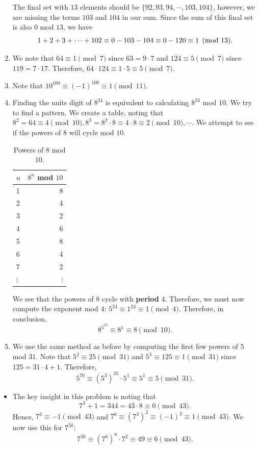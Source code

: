 \begin{enumerate}
	The final set with $13$ elements should be $\{92, 93, 94, \cdots, 103, 104\}$, however, we are \color{blue} missing the terms $103$ and $104$ in our sum\color{black}. Since the sum of this final set is also $0$ mod $13$, we have $$1+2+3+\cdots+102\equiv 0-103-104\equiv 0-12\-0\equiv 1\pmod{13}.$$ 
\clearpage
	\item We note that $64\equiv 1\pmod{7}$ since $63=9\cdot 7$ and $124\equiv 5\pmod{7}$ since $119=7\cdot 17$. Therefore, $64\cdot 124\equiv 1\cdot 5\equiv \boxed{5}\pmod{7}.$
	\item Note that $10^{100}\equiv \left(-1\right)^{100}\equiv 1\pmod{11}.$
	\item Finding the units digit of $8^{24}$ is equivalent to calculating $8^{24}$ mod $10$. We try to find a pattern. We create a table, noting that $8^2=64\equiv 4\pmod{10}, 8^3=8^2\cdot 8\equiv 4\cdot 8\equiv 2\pmod{10}, \cdots$. We attempt to see if the powers of $8$ will cycle mod $10$.
	\clearpage 
	\begin{table}[H]
		\centering
		\begin{tabular}{l r}
			\toprule
			$n$ & $8^n$ mod $10$ \\
			\midrule
			1 & 8\\
			2 & 4 \\ 
			3 & 2 \\
			4 & 6 \\
			5 & 8 \\
			6 & 4 \\
			7 & 2 \\
			$\vdots$ & $\vdots$  \\
			\bottomrule
		\end{tabular}
		\caption{Powers of $8$ mod $10$.}
	\end{table}
	\clearpage
	We see that the powers of $8$ cycle with \textbf{period} 4. Therefore, we must now compute the exponent mod $4$: $5^{24}\equiv 1^{24}\equiv 1\pmod{4}$. Therefore, in conclusion, $$8^{5^{24}}\equiv 8^{1}\equiv 8\pmod{10}.$$ 
	\item We use the same method as before by computing the first few powers of $5$ mod $31$. Note that $5^2\equiv 25\pmod{31}$ and $5^3\equiv 125\equiv 1\pmod{31}$ since $125=31\cdot 4+1$. Therefore, $$5^{70}\equiv \left(5^3\right)^{23}\cdot 5^1\equiv 5^1\equiv \boxed{5}\pmod{31}.$$
\end{enumerate}
\begin{itemize}[label=$\star$]
	\item The key insight in this problem is noting that $$7^3+1=344=43\cdot 8\equiv 0\pmod{43}.$$Hence, $7^3\equiv -1\pmod{43}$ and $7^6\equiv \left(7^3\right)^2\equiv (-1)^2\equiv 1\pmod{43}.$ We now use this for $7^{50}$: $$7^{50}\equiv \left(7^6\right)^8\cdot 7^2\equiv 49\equiv \boxed{6}\pmod{43}.$$
\end{itemize}

